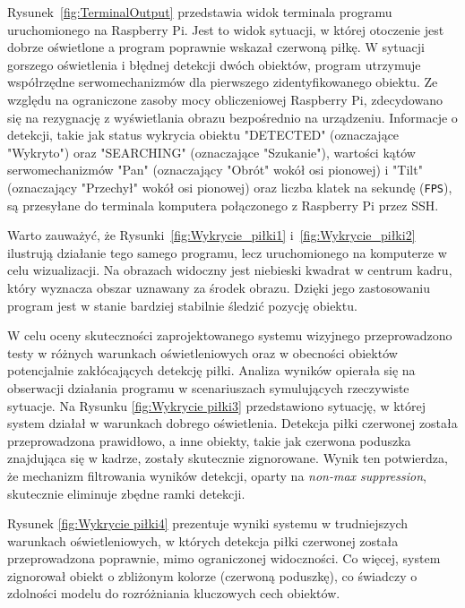 \documentclass[a4paper,twoside,12pt]{book}
\begin{document}
Rysunek~\ref{fig:TerminalOutput} przedstawia widok terminala programu uruchomionego na Raspberry Pi. Jest to widok sytuacji, w której otoczenie jest dobrze oświetlone a program poprawnie wskazał czerwoną piłkę. W sytuacji gorszego oświetlenia i błędnej detekcji dwóch obiektów, program utrzymuje współrzędne serwomechanizmów dla pierwszego zidentyfikowanego obiektu. Ze względu na ograniczone zasoby mocy obliczeniowej Raspberry Pi, zdecydowano się na rezygnację z wyświetlania obrazu bezpośrednio na urządzeniu. Informacje o detekcji, takie jak status wykrycia obiektu "DETECTED" (oznaczające "Wykryto") oraz "SEARCHING" (oznaczające "Szukanie"), wartości kątów serwomechanizmów "Pan" (oznaczający "Obrót" wokół osi pionowej) i "Tilt" (oznaczający "Przechył" wokół osi pionowej) oraz liczba klatek na sekundę (\texttt{FPS}), są przesyłane do terminala komputera połączonego z Raspberry Pi przez SSH.

Warto zauważyć, że Rysunki~\ref{fig:Wykrycie_piłki1} i~\ref{fig:Wykrycie_piłki2} ilustrują działanie tego samego programu, lecz uruchomionego na komputerze w celu wizualizacji. Na obrazach widoczny jest niebieski kwadrat w centrum kadru, który wyznacza obszar uznawany za środek obrazu. Dzięki jego zastosowaniu program jest w stanie bardziej stabilnie śledzić pozycję obiektu. 



\newpage
W celu oceny skuteczności zaprojektowanego systemu wizyjnego przeprowadzono testy w różnych warunkach oświetleniowych oraz w obecności obiektów potencjalnie zakłócających detekcję piłki. Analiza wyników opierała się na obserwacji działania programu w scenariuszach symulujących rzeczywiste sytuacje. Na Rysunku \ref{fig:Wykrycie piłki3} przedstawiono sytuację, w której system działał w warunkach dobrego oświetlenia. Detekcja piłki czerwonej została przeprowadzona prawidłowo, a inne obiekty, takie jak czerwona poduszka znajdująca się w kadrze, zostały skutecznie zignorowane. Wynik ten potwierdza, że mechanizm filtrowania wyników detekcji, oparty na \textit{non-max suppression}, skutecznie eliminuje zbędne ramki detekcji.

Rysunek \ref{fig:Wykrycie piłki4} prezentuje wyniki systemu w trudniejszych warunkach oświetleniowych, w których detekcja piłki czerwonej została przeprowadzona poprawnie, mimo ograniczonej widoczności. Co więcej, system zignorował obiekt o zbliżonym kolorze (czerwoną poduszkę), co świadczy o zdolności modelu do rozróżniania kluczowych cech obiektów.
\end{document}
